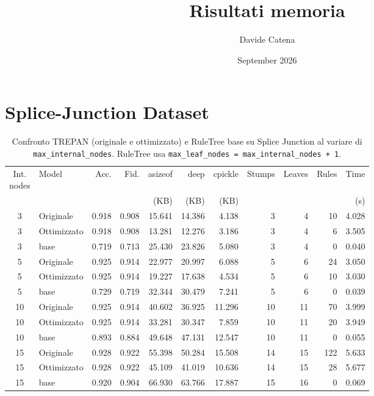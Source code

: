 \documentclass{article}
\title{Risultati memoria}
\author{Davide Catena}
\date{September 2026}
\begin{document}
\maketitle

\section{Splice-Junction Dataset}

\begin{table}[htbp]
\raggedright
\caption{Confronto TREPAN (originale e ottimizzato) e RuleTree base su Splice Junction al variare di \texttt{max\_internal\_nodes}. RuleTree usa \texttt{max\_leaf\_nodes = max\_internal\_nodes + 1}.}
\label{tab:risultati}
\footnotesize
\setlength{\tabcolsep}{3pt}
\begin{tabular}{c l r r r r r r r r r}
\toprule
\makecell{Int.\\nodes} & Model & Acc. & Fid. & asizeof & deep & cpickle & Stumps & Leaves & Rules & Time \\
 & & & & (KB) & (KB) & (KB) & & & & (s)  \\
\midrule
3 & Originale   & 0.918 & 0.908 & 15.641 & 14.386 & 4.138 & 3 & 4 & 10 & 4.028 \\
3 & Ottimizzato & 0.918 & 0.908 & 13.281 & 12.276 & 3.186 & 3 & 4 & 6 & 3.505 \\
3 & base        & 0.719 & 0.713 & 25.430 & 23.826 & 5.080 & 3 & 4 & 0 & 0.040 \\
\midrule
5 & Originale   & 0.925 & 0.914 & 22.977 & 20.997 & 6.088 & 5 & 6 & 24 & 3.050 \\
5 & Ottimizzato & 0.925 & 0.914 & 19.227 & 17.638 & 4.534 & 5 & 6 & 10 & 3.030 \\
5 & base        & 0.729 & 0.719 & 32.344 & 30.479 & 7.241 & 5 & 6 & 0 & 0.039 \\
\midrule
10 & Originale   & 0.925 & 0.914 & 40.602 & 36.925 & 11.296 & 10 & 11 & 70 & 3.999 \\
10 & Ottimizzato & 0.925 & 0.914 & 33.281 & 30.347 & 7.859 & 10 & 11 & 20 & 3.949 \\
10 & base        & 0.893 & 0.884 & 49.648 & 47.131 & 12.547 & 10 & 11 & 0 & 0.055 \\
\midrule
15 & Originale   & 0.928 & 0.922 & 55.398 & 50.284 & 15.508 & 14 & 15 & 122 & 5.633 \\
15 & Ottimizzato & 0.928 & 0.922 & 45.109 & 41.019 & 10.636 & 14 & 15 & 28 & 5.677 \\
15 & base        & 0.920 & 0.904 & 66.930 & 63.766 & 17.887 & 15 & 16 & 0 & 0.069 \\

\end{tabular}
\end{table}
\end{document}
